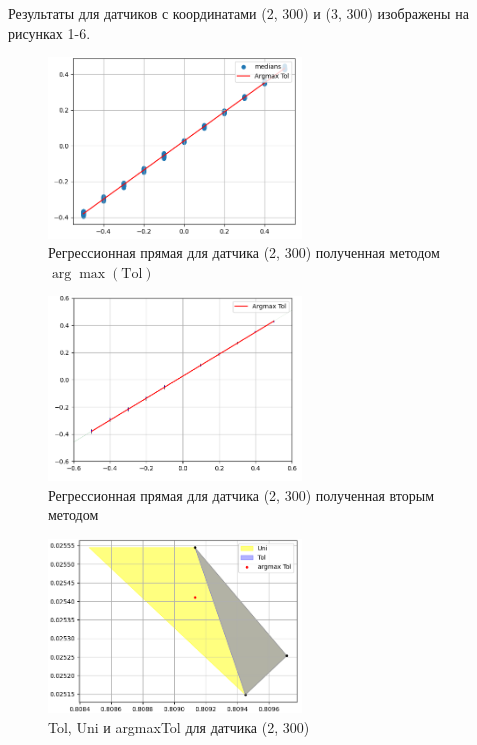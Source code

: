 \documentclass[a4paper,14pt]{extarticle}
\begin{document}
Результаты для датчиков с координатами (2, 300) и (3, 300) изображены на рисунках 1-6.
\clearpage
\begin{figure}[htbp]
    \centering
    \includegraphics[width=0.6\textwidth]{f1.png}
    \caption{Регрессионная прямая для датчика (2, 300) полученная методом $\arg\max(\text{Tol})$}
    \label{fig:hamiltonianGraph}
\end{figure}

\begin{figure}[htbp]
    \centering
    \includegraphics[width=0.6\textwidth]{f2.png}
    \caption{Регрессионная прямая для датчика (2, 300) полученная вторым методом}
    \label{fig:hamiltonianGraph}
\end{figure}
\clearpage
\begin{figure}[htbp]
    \centering
    \includegraphics[width=0.6\textwidth]{f3.png}
    \caption{Tol, Uni и argmaxTol для датчика (2, 300)}
    \label{fig:hamiltonianGraph}
\end{figure}
\end{document}
